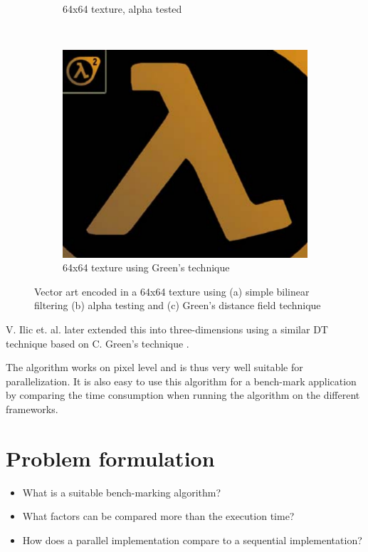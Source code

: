 \documentclass{article}
\begin{document}
\begin{figure}[!h]
\begin{subfigure}[b]{0.3\textwidth}
        \caption{64x64 texture, alpha tested}
        \label{fig:valveA}
    \end{subfigure}
    ~ 
    \begin{subfigure}[b]{0.3\textwidth}
        \includegraphics[width=\textwidth]{Figs/ValveGreensTechnique.png}
        \caption{64x64 texture using Green's technique}
        \label{fig:mouse}
    \end{subfigure}
    \caption{Vector art encoded in a 64x64 texture using (a) simple bilinear filtering (b) alpha testing and (c) Green's distance field technique}\label{fig:animals}
    \label{fig:valve}
\end{figure}

V. Ilic et. al. later extended this into three-dimensions using a similar DT technique based on C. Green's technique \cite{ilic2015precise}. 

The algorithm works on pixel level and is thus very well suitable for parallelization. It is also easy to use this algorithm for a bench-mark application by comparing the time consumption when running the algorithm on the different frameworks.


\section{Problem formulation}
\begin{itemize}
    \item What is a suitable bench-marking algorithm?
    \item What factors can be compared more than the execution time?
    \item How does a parallel implementation compare to a sequential implementation?
\end{itemize}
\end{document}
